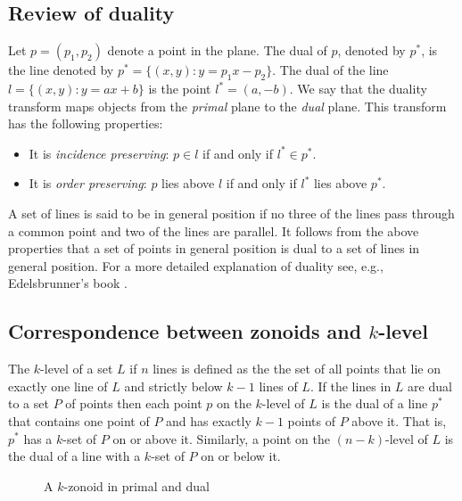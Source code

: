\documentclass{elsart}
\begin{document}
\subsection{Review of duality}\label{subsection_review_of_duality}

Let $p = (p_1, p_2)$ denote a point in the plane. The dual of $p$,
denoted by $p^*$, is the line denoted by $p^* = \{(x,y) : y = p_1x -
p_2\}$. The dual of the line $l = \{(x,y) : y = ax + b\}$ is the point
$l^* = (a,-b)$.  
We say that the duality transform maps objects from the \emph{primal}
plane to the \emph{dual} plane. This transform has the following
properties:

\begin{itemize}
\item It is \emph{incidence preserving}: $p \in l$ if and only if $l^*
\in p^*$.

\item It is \emph{order preserving}: $p$ lies above $l$ if and only if $l^*$ lies above $p^*$.
\end{itemize}

A set of lines is said to be in general position if no three of the
lines pass through a common point and two of the lines are parallel.
It follows from the above properties that a set of points in general
position is dual to a set of lines in general position. For a more
detailed explanation of duality see, e.g., Edelsbrunner's book
\cite{edelsbrunner_book}.

\subsection{Correspondence between zonoids and $k$-level}\label{subsection_correspondence_between_zonoids_and_klevel}

The $k$-level of a set $L$ if $n$ lines is defined as the the set of
all points that lie on exactly one line of $L$ and strictly below
$k-1$ lines of $L$. If the lines in $L$ are dual to a set $P$ of
points then each  point $p$ on the $k$-level of $L$ is the dual of a
line $p^*$ that contains one point of $P$ and has exactly $k-1$ points
of $P$ above it.  That is, $p^*$ has a $k$-set of $P$ on or above it.
Similarly, a point on the $(n-k)$-level of $L$ is the dual of a line
with a $k$-set of $P$ on or below it.

\begin{figure}
 \begin{center} 
   \caption{A $k$-zonoid in primal and dual}
   \label{fig_primal_dual}
 \end{center}
\end{figure}
\end{document}
